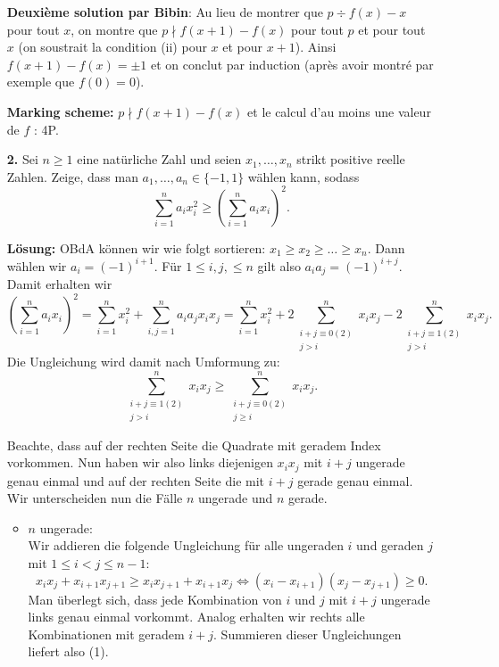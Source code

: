 \documentclass[language=german,style=solution]{smo}
\begin{document}
\begin{enumerate}
\textbf{Deuxième solution par Bibin}: Au lieu de montrer que $p\div f(x)-x$ pour tout $x$, on montre que $p\nmid f(x+1)-f(x)$ pour tout $p$ et pour tout $x$ (on soustrait la condition (ii) pour $x$ et pour $x+1$). Ainsi $f(x+1)-f(x)=\pm 1$ et on conclut par induction (après avoir montré par exemple que $f(0)=0$).

\textbf{Marking scheme:} $p\nmid f(x+1)-f(x)$ et le calcul d'au moins une valeur de $f$ : 4P.


\newpage

\item[\textbf{2.}] %
Sei $n\geq 1$ eine natürliche Zahl und seien $x_1,\ldots,x_n$ strikt positive reelle Zahlen. Zeige, dass man $a_1,\ldots,a_n\in\{-1,1\}$ wählen kann, sodass
\[
\sum_{i=1}^na_ix_i^2\geq\left(\sum_{i=1}^n a_ix_i\right)^2.
\]

\textbf{Lösung:}
OBdA können wir wie folgt sortieren: $x_1  \geq x_2 \geq \dots \geq x_n$. Dann wählen wir $a_i = (-1)^{i+1}.$ Für $1 \leq i,j, \leq n$ gilt also $a_ia_j = (-1)^{i+j}$. Damit erhalten wir 
\[
(\sum_{i=1}^n a_ix_i)^2 = 
\sum_{i=1}^n x_i^2 + \sum_{i,j=1}^n a_ia_jx_ix_j = 
\sum_{i=1}^n x_i^2 + 
2\sum_{\substack{i+j \equiv 0 (2)\\ j>i}}^n x_ix_j - 
2\sum_{\substack{i+j \equiv 1 (2)\\ j>i}}^n x_ix_j.
\]
Die Ungleichung wird damit nach Umformung zu:
\begin{equation}
\sum_{\substack{i+j \equiv 1 (2)\\ j>i}}^n x_ix_j \geq \sum_{\substack{i+j \equiv 0 (2)\\ j\geq i}}^n x_ix_j.
\end{equation}

Beachte, dass auf der rechten Seite die Quadrate mit geradem Index vorkommen. Nun haben wir also links diejenigen $x_ix_j$ mit $i + j$ ungerade genau einmal und auf der rechten Seite die mit $i+j$ gerade genau einmal. Wir unterscheiden nun die Fälle $n$ ungerade und $n$ gerade.
\begin{itemize}
\item $n$ ungerade: \\
Wir addieren die folgende Ungleichung für alle ungeraden $i$ und geraden $j$ mit $1 \leq i < j \leq n-1$:
\[
x_ix_j + x_{i+1}x_{j+1} \geq x_ix_{j+1} + x_{i+1}x_j \iff (x_i - x_{i+1})(x_j - x_{j+1}) \geq 0.
\]
Man überlegt sich, dass jede Kombination von $i$ und $j$ mit $i+j$ ungerade links genau einmal vorkommt. Analog erhalten wir rechts alle Kombinationen mit geradem $i+j$. Summieren dieser Ungleichungen liefert also (1).


\end{itemize}
\end{enumerate}
\end{document}

